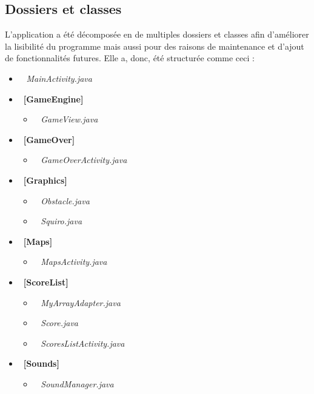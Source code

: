 \documentclass[12pt,a4paper,abstract=on,parskip=full]{scrartcl}
\begin{document}
\subsection{Dossiers et classes}
\label{section:hello} %

L'application a été décomposée en de multiples dossiers et classes afin d'améliorer la lisibilité du programme mais aussi pour des raisons de maintenance et d'ajout de fonctionnalités futures.
Elle a, donc, été structurée comme ceci :

\begin{itemize}[label=$\bullet$, nosep]
\item\ \textit{\color{blue} MainActivity.java}

\item\ \textbf{[GameEngine]}
\begin{itemize}[nosep]
\item\ \textit{\color{blue} GameView.java}
\end{itemize}

\item\ \textbf{[GameOver]}
\begin{itemize}[nosep]
\item\ \textit{\color{blue} GameOverActivity.java}
\end{itemize}

\item\ \textbf{[Graphics]}
\begin{itemize}[nosep]
\item\ \textit{\color{blue} Obstacle.java}
\item\ \textit{\color{blue} Squiro.java}
\end{itemize}

\item\ \textbf{[Maps]}
\begin{itemize}[nosep]
\item\ \textit{\color{blue} MapsActivity.java}
\end{itemize}

\item\ \textbf{[ScoreList]}
\begin{itemize}[nosep]
\item\ \textit{\color{blue} MyArrayAdapter.java}
\item\ \textit{\color{blue} Score.java}
\item\ \textit{\color{blue} ScoresListActivity.java}
\end{itemize}

\item\ \textbf{[Sounds]}
\begin{itemize}[nosep]
\item\ \textit{\color{blue} SoundManager.java}
\end{itemize}

\end{itemize}
\end{document}
